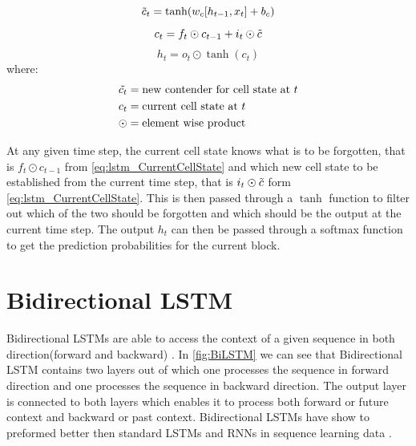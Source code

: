\begin{equation}\label{eq:lstm_newCellState}
    \Tilde{c}_{t} =\tanh(w_{c}[h_{t-1},x_{t}]+b_{c})
\end{equation}
\begin{equation} \label{eq:lstm_CurrentCellState}
    c_{t} = f_{t} \odot c_{t-1} + i_{t} \odot \Tilde{c}
\end{equation}
\begin{equation}\label{eq:lstm_output}
    h_{t} = o_{t} \odot \tanh(c_{t})
\end{equation}
where:
\begin{align*}
      & \Tilde{c_{t}}=\text{new contender for cell state at $t$}\\
      & c_{t}=\text{current cell state at $t$}\\
      & \odot=\text{element wise product}
\end{align*}


At any given time step, the current cell state knows what is to be forgotten, that is $f_{t}\odot c_{t-1}$ from \ref{eq:lstm_CurrentCellState} and which new cell state to be established from the current time step, that is $i_{t}\odot \Tilde{c}$ form \ref{eq:lstm_CurrentCellState}. This is then passed through a $\tanh$ function to filter out which of the two should be forgotten and which should be the output at the current time step. The output $h_{t}$ can then be passed through a softmax function to get the prediction probabilities for the current block.




\section{Bidirectional LSTM}
Bidirectional LSTMs are  able to access the context of a given sequence in both direction(forward and backward) \cite{schuster1997bidirectional}. In \ref{fig:BiLSTM} we can see that Bidirectional LSTM contains two layers out of which one processes the sequence in forward direction and one processes the sequence in backward direction. The output layer is connected to both layers which enables it to process both forward or future context and backward or past context. Bidirectional LSTMs have show to preformed better then standard LSTMs and RNNs in sequence learning data \cite{baldi2000bidirectional} \cite{fukada1999phoneme}.

